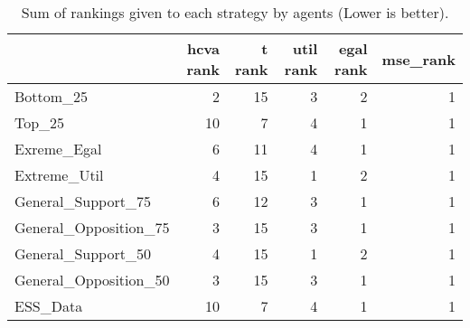 \begin{table}
\caption{Sum of rankings given to each strategy by agents (Lower is better).}
\begin{tabular}{lrrrrr}
\toprule
 & hcva rank & t rank & util rank & egal rank & mse_rank \\
\midrule
Bottom_25 & 2 & 15 & 3 & 2 & 1 \\
Top_25 & 10 & 7 & 4 & 1 & 1 \\
Exreme_Egal & 6 & 11 & 4 & 1 & 1 \\
Extreme_Util & 4 & 15 & 1 & 2 & 1 \\
General_Support_75 & 6 & 12 & 3 & 1 & 1 \\
General_Opposition_75 & 3 & 15 & 3 & 1 & 1 \\
General_Support_50 & 4 & 15 & 1 & 2 & 1 \\
General_Opposition_50 & 3 & 15 & 3 & 1 & 1 \\
ESS_Data & 10 & 7 & 4 & 1 & 1 \\
\bottomrule
\end{tabular}
\end{table}
